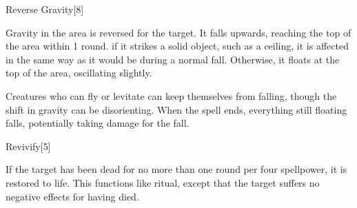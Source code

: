 \begin{spellsection}{Reverse Gravity}[8]
    \begin{spellheader}
    \end{spellheader}
    \begin{spellcontent}
        \begin{spelltargetinginfo}
        \end{spelltargetinginfo}
        \begin{spelleffects}
            \spelleffect Gravity in the area is reversed for the target. It falls upwards, reaching the top of the area within 1 round. if it strikes a solid object, such as a ceiling, it is affected in the same way as it would be during a normal fall. Otherwise, it floats at the top of the area, oscillating slightly.
            \spelldur \durshort
        \end{spelleffects}
    \end{spellcontent}
    \begin{spellfooter}
        \spellnotes Creatures who can fly or levitate can keep themselves from falling, though the shift in gravity can be disorienting. When the spell ends, everything still floating falls, potentially taking damage for the fall.
        \miscastyou
    \end{spellfooter}
\end{spellsection}

\begin{spellsection}{Revivify}[5]
    \begin{spellheader}
    \end{spellheader}
    \begin{spellcontent}
        \begin{spelltargetinginfo}
        \end{spelltargetinginfo}
        \begin{spelleffects}
            \spelleffect If the target has been dead for no more than one round per four spellpower, it is restored to life. This functions like  ritual, except that the target suffers no negative effects for having died.
        \end{spelleffects}
    \end{spellcontent}
    \begin{spellfooter}
        \miscastexplode
    \end{spellfooter}
\end{spellsection}

